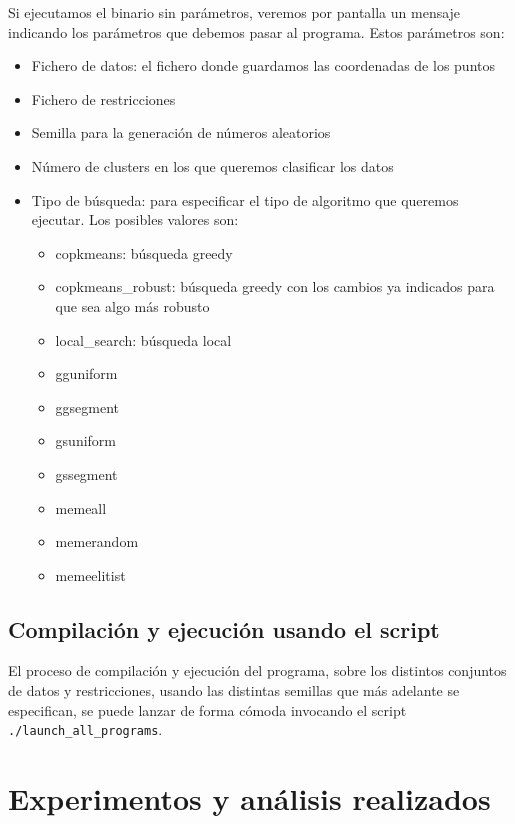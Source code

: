 \documentclass[11pt]{article}
\begin{document}
Si ejecutamos el binario sin parámetros, veremos por pantalla un mensaje indicando los parámetros que debemos pasar al programa. Estos parámetros son:

\begin{itemize}
    \item Fichero de datos: el fichero donde guardamos las coordenadas de los puntos
    \item Fichero de restricciones
    \item Semilla para la generación de números aleatorios
    \item Número de clusters en los que queremos clasificar los datos
    \item Tipo de búsqueda: para especificar el tipo de algoritmo que queremos ejecutar. Los posibles valores son:
    \begin{itemize}
        \item copkmeans: búsqueda greedy
        \item copkmeans\_robust: búsqueda greedy con los cambios ya indicados para que sea algo más robusto
        \item local\_search: búsqueda local
        \item gguniform
        \item ggsegment
        \item gsuniform
        \item gssegment
        \item memeall
        \item memerandom
        \item memeelitist
    \end{itemize}
\end{itemize}

\subsection{Compilación y ejecución usando el script}

El proceso de compilación y ejecución del programa, sobre los distintos conjuntos de datos y restricciones, usando las distintas semillas que más adelante se especifican, se puede lanzar de forma cómoda invocando el script \lstinline{./launch_all_programs}.

\pagebreak

\section{Experimentos y análisis realizados}
\end{document}
